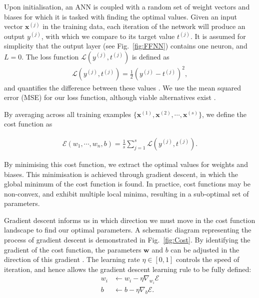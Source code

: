 \documentclass[twocolumn,superscriptaddress]{revtex4-1}
\begin{document}
Upon initialisation, an ANN is coupled with a random set of weight vectors and biases for which it is tasked with finding the optimal values. Given an input vector $\bm{x}^{(j)}$ in the training data, each iteration of the network will produce an output $y^{(j)}$, with which we compare to its target value $t^{(j)}$. It is assumed for simplicity that the output layer (see Fig.~\ref{fig:FFNN}) contains one neuron, and $L=0$. The loss function $\mathcal{L}(y^{(j)}, t^{(j)})$ is defined as
\begin{equation} \label{eq:loss}
\begin{split}
\mathcal{L}(y^{(j)}, t^{(j)}) = \frac{1}{2} (y^{(j)} - t^{(j)})^2,
\end{split}
\end{equation}
and quantifies the difference between these values \cite{Roger2018}. We use the mean squared error (MSE) for our loss function, although viable alternatives exist \cite{Beer:2022wgv}. 

By averaging across all training examples $\{\bm{x}^{(1)}, \bm{x}^{(2)}, \cdots, \bm{x}^{(s)}\}$, we define the cost function as

\begin{equation} \label{eq:cost}
\begin{split}
\mathcal{E} (w_1, \cdots, w_n, b) = \frac{1}{s} \sum_{j=1}^s \mathcal{L} (y^{(j)}, t^{(j)}).
\end{split}
\end{equation}

By minimising this cost function, we extract the optimal values for weights and biases. This minimisation is achieved through gradient descent, in which the global minimum of the cost function is found. In practice, cost functions may be non-convex, and exhibit multiple local minima, resulting in a sub-optimal set of parameters.

Gradient descent informs us in which direction we must move in the cost function landscape to find our optimal parameters. A schematic diagram representing the process of gradient descent is demonstrated in Fig.~\ref{fig:Cost}. By identifying the gradient of the cost function, the parameters ${\bm{w}}$ and $b$ can be adjusted in the direction of this gradient \cite{Beer:2022wgv, Ahmed2015}. The learning rate $\eta \in [0, 1]$ controls the speed of iteration, and hence allows the gradient descent learning rule to be fully defined:
\begin{equation} \label{eq:gradient}
\begin{split}
w_i &\leftarrow w_i - \eta \nabla_{w_i} \mathcal{E} \\
b &\leftarrow b - \eta \nabla_b \mathcal{E}.
\end{split}
\end{equation}
\end{document}
